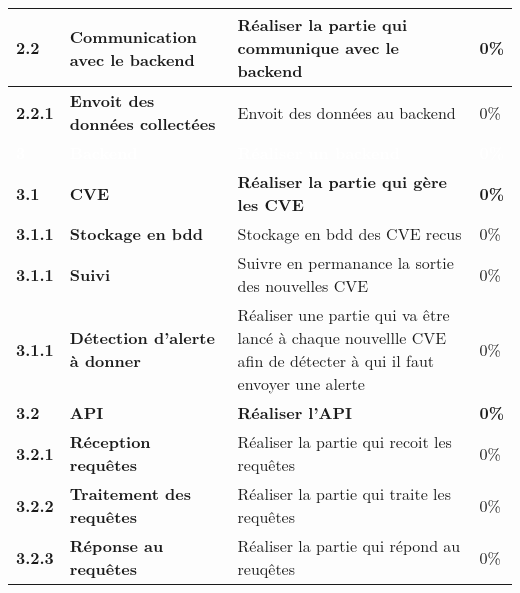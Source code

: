 \begin{supertabular}{|p{1.5cm} p{6cm}|p{5cm}|R{2cm}|}
  \textbf{2.2}  & \textbf{Communication avec le backend} & \textbf{Réaliser la partie qui communique avec le backend} & \textbf{0\%} \\
  \hline

  \hspace{6pt}
  \textbf{2.2.1}  & \textbf{Envoit des données collectées} & Envoit des données au backend & 0\% \\
  \hline


  \textcolor{white}{\textbf{3}}  & \textcolor{white}{\textbf{Backend}} & \textcolor{white}{\textbf{Réaliser un backend}} & \textcolor{white}{\textbf{0\%}} \\
  \hline

  \textbf{3.1}  & \textbf{CVE} & \textbf{Réaliser la partie qui gère les CVE} & \textbf{0\%} \\
  \hline

  \hspace{6pt}
  \textbf{3.1.1}  & \textbf{Stockage en bdd} & Stockage en bdd des CVE recus & 0\% \\
  \hline

  \hspace{6pt}
  \textbf{3.1.1}  & \textbf{Suivi} & Suivre en permanance la sortie des nouvelles CVE  & 0\% \\
  \hline

  \hspace{6pt}
  \textbf{3.1.1}  & \textbf{Détection d'alerte à donner} & Réaliser une partie qui va être lancé à chaque nouvellle CVE afin de détecter à qui il faut envoyer une alerte & 0\% \\
  \hline


  \textbf{3.2}  & \textbf{API} & \textbf{Réaliser l'API} & \textbf{0\%} \\
  \hline

  \hspace{6pt}
  \textbf{3.2.1}  & \textbf{Réception requêtes} & Réaliser la partie qui recoit les requêtes & 0\% \\
  \hline

  \hspace{6pt}
  \textbf{3.2.2}  & \textbf{Traitement des requêtes} & Réaliser la partie qui traite les requêtes  & 0\% \\
  \hline

  \hspace{6pt}
  \textbf{3.2.3}  & \textbf{Réponse au requêtes} & Réaliser la partie qui répond au reuqêtes & 0\% \\
  \hline



\end{supertabular}
